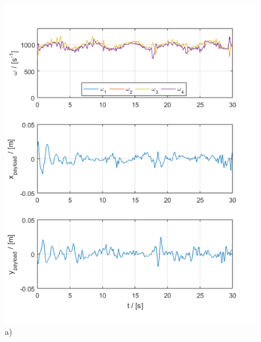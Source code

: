\begin{figure}[h!]
	\centering
	\begin{minipage}{0.5\columnwidth}
		\centering
		\includegraphics[width=\columnwidth]{./pictures/manip_traj_control.png}
		\caption*{a)}
		\label{fig:manip_control}
	\end{minipage}%
	\begin{minipage}{0.5\columnwidth}
		\centering

\end{minipage}
\end{figure}
